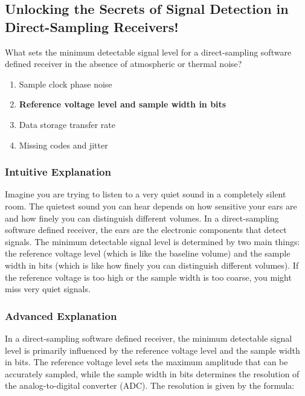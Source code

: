 \subsection{Unlocking the Secrets of Signal Detection in Direct-Sampling Receivers!}

\begin{tcolorbox}[colback=gray!10!white,colframe=black!75!black,title=\textbf{E7F11}]
What sets the minimum detectable signal level for a direct-sampling software defined receiver in the absence of atmospheric or thermal noise?
\begin{enumerate}[label=\Alph*.]
    \item Sample clock phase noise
    \item \textbf{Reference voltage level and sample width in bits}
    \item Data storage transfer rate
    \item Missing codes and jitter
\end{enumerate}
\end{tcolorbox}

\subsubsection*{Intuitive Explanation}
Imagine you are trying to listen to a very quiet sound in a completely silent room. The quietest sound you can hear depends on how sensitive your ears are and how finely you can distinguish different volumes. In a direct-sampling software defined receiver, the ears are the electronic components that detect signals. The minimum detectable signal level is determined by two main things: the reference voltage level (which is like the baseline volume) and the sample width in bits (which is like how finely you can distinguish different volumes). If the reference voltage is too high or the sample width is too coarse, you might miss very quiet signals.

\subsubsection*{Advanced Explanation}
In a direct-sampling software defined receiver, the minimum detectable signal level is primarily influenced by the reference voltage level and the sample width in bits. The reference voltage level sets the maximum amplitude that can be accurately sampled, while the sample width in bits determines the resolution of the analog-to-digital converter (ADC). The resolution is given by the formula:

